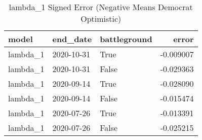 \begin{table}
\centering
\caption{lambda_1 Signed Error
(Negative Means Democrat Optimistic)}
\label{table:lambda\_1\_signed\_error\_time\_series}
\begin{tabular}{lllr}
\toprule
    model &    end\_date &  battleground &     error \\
\midrule
 lambda\_1 &  2020-10-31 &          True & -0.009007 \\
 lambda\_1 &  2020-10-31 &         False & -0.029363 \\
 lambda\_1 &  2020-09-14 &          True & -0.028090 \\
 lambda\_1 &  2020-09-14 &         False & -0.015474 \\
 lambda\_1 &  2020-07-26 &          True & -0.013391 \\
 lambda\_1 &  2020-07-26 &         False & -0.025215 \\
\bottomrule
\end{tabular}
\end{table}
